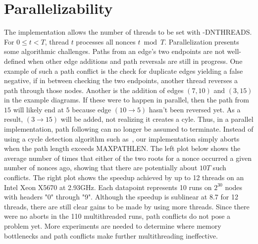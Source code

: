 \documentclass[11pt, oneside]{article}
\begin{document}
\section{Parallelizability}
The implementation allows the number of threads to be set with -DNTHREADS.
For $0\leq t < T$, thread $t$ processes all nonces $t \bmod T$.
Parallelization presents some algorithmic challenges. Paths from an edge's two endpoints
are not well-defined when other edge additions and path reversals are still in progress.
One example of such a path conflict is the check for duplicate edges yielding a false negative,
if in between checking the two endpoints, another thread reverses a path through those nodes.
Another is the addition of edges $(7,10)$ and $(3,15)$ in the example diagrams.
If these were to happen in parallel, then the path from $15$ will likely end at $5$ because
edge $(10 \rightarrow 5)$ hasn't been reversed yet.
As a result, $(3 \rightarrow 15)$ will be added, not realizing it creates a cyle.
Thus, in a parallel implementation, path following can no longer be assumed to terminate.
Instead of using a cycle detection algorithm such as~\cite{1980-brent-cycles}, our implementation
simply aborts when the path length exceeds MAXPATHLEN.
The left plot below shows the average number of times that either of the two roots
for a nonce occurred a given number of nonces ago, showing that there are potentially
about $10T$ such conflicts.
The right plot shows the speedup achieved by up to 12 threads on an Intel Xeon X5670 at 2.93GHz.
Each datapoint represents 10 runs on $2^{30}$ nodes with headers "0" through "9".
Although the speedup is sublinear at 8.7 for 12 threads, there are still clear gains to be made
by using more threads. Since there were no aborts in the 110 multithreaded runs, path conflicts
do not pose a problem yet. More experiments are needed to determine where memory bottlenecks
and path conflicts make further multithreading ineffective.
\end{document}
